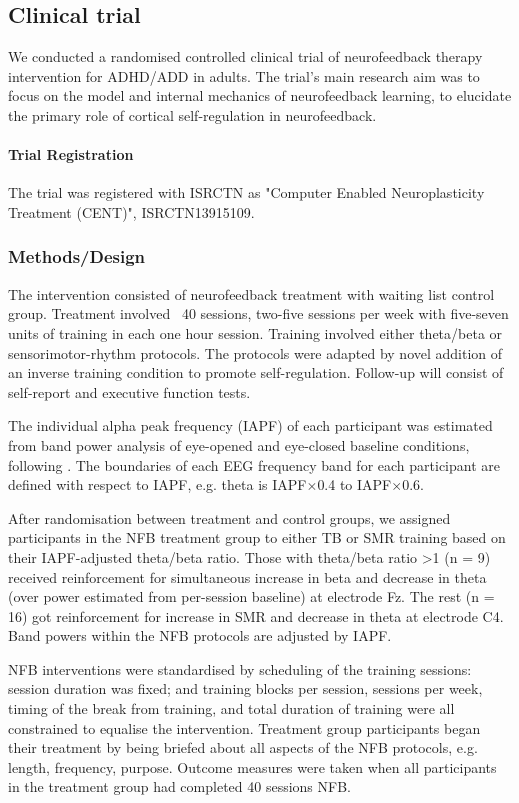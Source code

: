 \subsection{Clinical trial}

We conducted a randomised controlled clinical trial of neurofeedback therapy intervention for ADHD/ADD in adults. The trial's main research aim was to focus on the model and internal mechanics of neurofeedback learning, to elucidate the primary role of cortical self-regulation in neurofeedback.

\paragraph{Trial Registration}
The trial was registered with ISRCTN as "Computer Enabled Neuroplasticity Treatment (CENT)", ISRCTN13915109.


\subsubsection{Methods/Design}
The intervention consisted of neurofeedback treatment with waiting list control group. Treatment involved ~40 sessions, two-five sessions per week with five-seven units of training in each one hour session. Training involved either theta/beta or sensorimotor-rhythm protocols. The protocols were adapted by novel addition of an inverse training condition to promote self-regulation. Follow-up will consist of self-report and executive function tests.

The individual alpha peak frequency (IAPF) of each participant was estimated from band power analysis of eye-opened and eye-closed baseline conditions, following \cite{Lansbergen2011}. The boundaries of each EEG frequency band for each participant are defined with respect to IAPF, e.g. theta is IAPF$\times$0.4 to IAPF$\times$0.6.

After randomisation between treatment and control groups, we assigned participants in the NFB treatment group to either TB or SMR training based on their IAPF-adjusted theta/beta ratio. Those with theta/beta ratio \textgreater 1 (n = 9) received reinforcement for simultaneous increase in beta and decrease in theta (over power estimated from per-session baseline) at electrode Fz. The rest (n = 16) got reinforcement for increase in SMR and decrease in theta at electrode C4. Band powers within the NFB protocols are adjusted by IAPF. 

NFB interventions were standardised by scheduling of the training sessions: session duration was fixed; and training blocks per session, sessions per week, timing of the break from training, and total duration of training were all constrained to equalise the intervention. Treatment group participants began their treatment by being briefed about all aspects of the NFB protocols, e.g. length, frequency, purpose. Outcome measures were taken when all participants in the treatment group had completed 40 sessions NFB.



